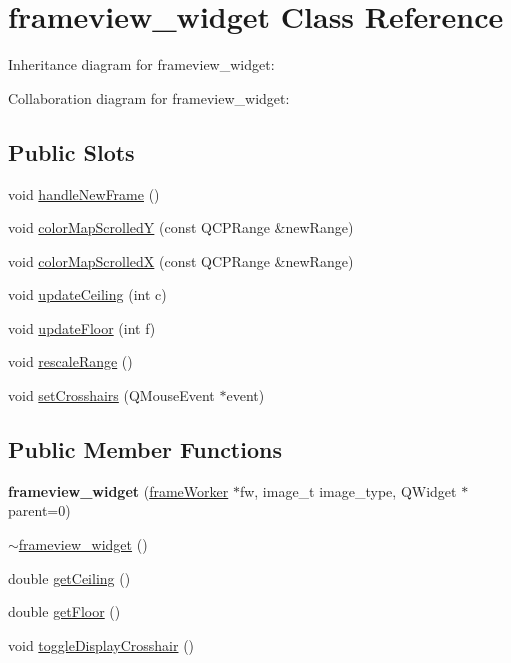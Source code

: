 \hypertarget{classframeview__widget}{\section{frameview\+\_\+widget Class Reference}
\label{classframeview__widget}
}


Inheritance diagram for frameview\+\_\+widget\+:


Collaboration diagram for frameview\+\_\+widget\+:
\subsection*{Public Slots}
\begin{DoxyCompactItemize}
\item 
void \hyperlink{group__renderfunc_gaa85cabb8164a58ede6bd893d26599de0}{handle\+New\+Frame} ()
\item 
void \hyperlink{group__plotfunc_ga3074750f0969ffba239e316765643032}{color\+Map\+Scrolled\+Y} (const Q\+C\+P\+Range \&new\+Range)
\item 
void \hyperlink{group__plotfunc_ga10c1c059252f3646085daa6a0fd772ca}{color\+Map\+Scrolled\+X} (const Q\+C\+P\+Range \&new\+Range)
\item 
void \hyperlink{group__plotfunc_gad4ef028cf39c4fcccf7946b6c92bb354}{update\+Ceiling} (int c)
\item 
void \hyperlink{group__plotfunc_ga5cf94e8bd5b9b341685fd7c29944373e}{update\+Floor} (int f)
\item 
void \hyperlink{group__plotfunc_gaed72318cf7ec830f9ce3f5d314bc0f8c}{rescale\+Range} ()
\item 
void \hyperlink{group__plotfunc_gac7f78be091830f38f239480f29dfe869}{set\+Crosshairs} (Q\+Mouse\+Event $\ast$event)
\end{DoxyCompactItemize}
\subsection*{Public Member Functions}
\begin{DoxyCompactItemize}
\item 
\hypertarget{classframeview__widget_ade5e335522f656093d0da2af5e995c5c}{{\bfseries frameview\+\_\+widget} (\hyperlink{classframeWorker}{frame\+Worker} $\ast$fw, image\+\_\+t image\+\_\+type, Q\+Widget $\ast$parent=0)}\label{classframeview__widget_ade5e335522f656093d0da2af5e995c5c}

\item 
\hyperlink{classframeview__widget_affba223baf9e6e2ee85f3030435177e3}{$\sim$frameview\+\_\+widget} ()
\item 
double \hyperlink{group__getters_gaddbeea24241fb3ff7f54484fe3b104b5}{get\+Ceiling} ()
\item 
double \hyperlink{group__getters_ga64d9bcc11926e2d51c98bf3b262d6b1f}{get\+Floor} ()
\item 
void \hyperlink{classframeview__widget_ac606b2347e73db0b1fd70f7bd7db125a}{toggle\+Display\+Crosshair} ()
\end{DoxyCompactItemize}
